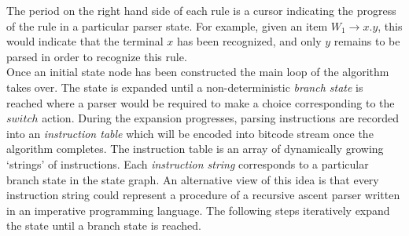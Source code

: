 \documentclass[a4paper,11pt]{article}
\begin{document}
The period on the right hand side of each rule is a cursor indicating the progress of the rule in a particular parser state.
For example, given an item $W_1 \rightarrow x . y$, this would indicate that the terminal $x$ has been recognized, and only $y$ remains to be parsed in order to recognize this rule.\\

Once an initial state node has been constructed the main loop of the algorithm takes over. 
The state is expanded until a non-deterministic \emph{branch state} is reached where a parser would be required to make a choice corresponding to the $switch$ action.
During the expansion progresses, parsing instructions are recorded into an \emph{instruction table} which will be encoded into bitcode stream once the algorithm completes.
The instruction table is an array of dynamically growing `strings' of instructions. 
Each \emph{instruction string} corresponds to a particular branch state in the state graph.
An alternative view of this idea is that every instruction string could represent a procedure of a recursive ascent parser written in an imperative programming language.
The following steps iteratively expand the state until a branch state is reached.
\end{document}
